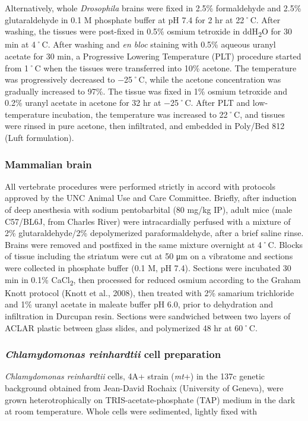 \documentclass{article}
\begin{document}
Alternatively, whole \emph{Drosophila} brains were fixed in 2.5\% formaldehyde and 2.5\% glutaraldehyde in 0.1 M phosphate buffer at pH 7.4 for 2 hr at 22˚C. After washing, the tissues were post-fixed in 0.5\% osmium tetroxide in ddH\textsubscript{2}O for 30 min at 4˚C. After washing and \emph{en bloc} staining with 0.5\% aqueous uranyl acetate for 30 min, a Progressive Lowering Temperature (PLT) procedure started from 1˚C when the tissues were transferred into 10\% acetone. The temperature was progressively decreased to −25˚C, while the acetone concentration was gradually increased to 97\%. The tissue was fixed in 1\% osmium tetroxide and 0.2\% uranyl acetate in acetone for 32 hr at −25˚C. After PLT and low-temperature incubation, the temperature was increased to 22˚C, and tissues were rinsed in pure acetone, then infiltrated, and embedded in Poly/Bed 812 (Luft formulation).

\subsubsection*{Mammalian brain}

All vertebrate procedures were performed strictly in accord with protocols approved by the UNC Animal Use and Care Committee. Briefly, after induction of deep anesthesia with sodium pentobarbital (80 mg/kg IP), adult mice (male C57/BL6J, from Charles River) were intracardially perfused with a mixture of 2\% glutaraldehyde/2\% depolymerized paraformaldehyde, after a brief saline rinse. Brains were removed and postfixed in the same mixture overnight at 4˚C. Blocks of tissue including the striatum were cut at 50 μm on a vibratome and sections were collected in phosphate buffer (0.1 M, pH 7.4). Sections were incubated 30 min in 0.1\% CaCl\textsubscript{2}, then processed for reduced osmium according to the Graham Knott protocol (Knott et al., 2008), then treated with 2\% samarium trichloride and 1\% uranyl acetate in maleate buffer pH 6.0, prior to dehydration and infiltration in Durcupan resin. Sections were sandwiched between two layers of ACLAR plastic between glass slides, and polymerized 48 hr at 60˚C.

\subsubsection*{\emph{Chlamydomonas reinhardtii} cell preparation}

\emph{Chlamydomonas reinhardtii} cells, 4A+ strain (\emph{mt}+) in the 137c genetic background obtained from Jean-David Rochaix (University of Geneva), were grown heterotrophically on TRIS-acetate-phosphate (TAP) medium in the dark at room temperature. Whole cells were sedimented, lightly fixed with
\end{document}
